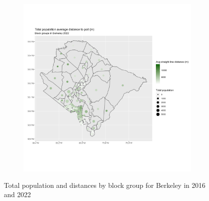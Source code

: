 \documentclass[11pt]{article}
\theoremstyle{remark}
\theoremstyle{definition}
\begin{document}
\begin{figure}
\begin{subfigure}{.5\textwidth}
		\includegraphics[width=\linewidth]{result analysis/Berkeley_SC_original_configs/population_pop_and_dist_Berkeley_config_original_2022_polls.png}
		\label{sfig:Berkeley_2022_bg_dist}
	\end{subfigure}
	\caption{Total population and distances by block group for Berkeley in 2016 and 2022}
	\label{fig:Berkeley distance Total population maps}
\end{figure}
\end{document}
